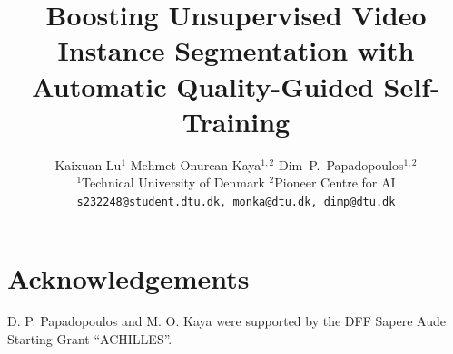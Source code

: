 \documentclass[10pt,twocolumn,letterpaper]{article}
\title{Boosting Unsupervised Video Instance Segmentation with \\ Automatic Quality-Guided Self-Training}
\author{
Kaixuan Lu$^{1}$ \quad Mehmet Onurcan Kaya$^{1,2}$ Dim~P.~Papadopoulos$^{1,2}$\\%
$^{1}$Technical University of Denmark \quad 
$^{2}$Pioneer Centre for AI\\%
\texttt{\small s232248@student.dtu.dk, monka@dtu.dk, dimp@dtu.dk}
}
\begin{document}
\maketitle
    





\section*{Acknowledgements}
D. P. Papadopoulos and M. O. Kaya were supported by the DFF Sapere Aude Starting Grant
``ACHILLES''.
{
    \small
    
    
}


\end{document}
